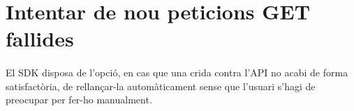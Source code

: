 \section{Intentar de nou peticions GET fallides}

    \paragraph{}
    El SDK disposa de l'opció, en cas que una crida contra l'API no acabi de forma satisfactòria, de rellançar-la automàticament sense que l'usuari s'hagi de preocupar per fer-ho manualment.
